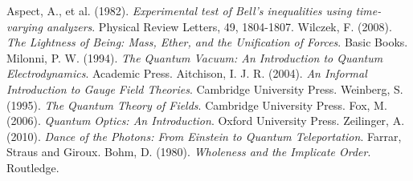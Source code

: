 \documentclass[a4paper,12pt]{article}
\theoremstyle{definition}
\theoremstyle{remark}
\begin{document}
\begin{thebibliography}{99}
		 Aspect, A., et al. (1982). \textit{Experimental test of Bell's inequalities using time-varying analyzers}. Physical Review Letters, 49, 1804-1807.
		 Wilczek, F. (2008). \textit{The Lightness of Being: Mass, Ether, and the Unification of Forces}. Basic Books.
		 Milonni, P. W. (1994). \textit{The Quantum Vacuum: An Introduction to Quantum Electrodynamics}. Academic Press.
		 Aitchison, I. J. R. (2004). \textit{An Informal Introduction to Gauge Field Theories}. Cambridge University Press.
		 Weinberg, S. (1995). \textit{The Quantum Theory of Fields}. Cambridge University Press.
		 Fox, M. (2006). \textit{Quantum Optics: An Introduction}. Oxford University Press.
		 Zeilinger, A. (2010). \textit{Dance of the Photons: From Einstein to Quantum Teleportation}. Farrar, Straus and Giroux.
		 Bohm, D. (1980). \textit{Wholeness and the Implicate Order}. Routledge.
	\end{thebibliography}
	
\end{document}
